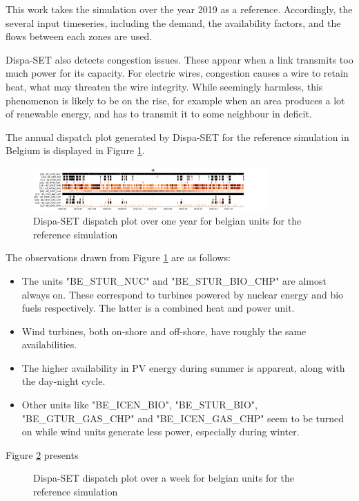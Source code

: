 This work takes the simulation over the year 2019 as a reference. Accordingly, the several input timeseries, including the demand, the availability factors, and the flows between each zones are used.

Dispa-SET also detects congestion issues. These appear when a link transmits too much power for its capacity. For electric wires, congestion causes a wire to retain heat, what may threaten the wire integrity. While seemingly harmless, this phenomenon is likely to be on the rise, for example when an area produces a lot of renewable energy, and has to transmit it to some neighbour in deficit.

The annual dispatch plot generated by Dispa-SET for the reference simulation in Belgium is displayed in Figure \ref{fig:dispatch-be}.

\begin{figure}[h]
    \centering
    \includegraphics[width=0.8\textwidth]{resources/images/dispatch-BE.png}
    \caption{Dispa-SET dispatch plot over one year for belgian units for the reference simulation}
    \label{fig:dispatch-be}
\end{figure}

The observations drawn from Figure \ref{fig:dispatch-be} are as follows:
\begin{itemize}
    \item The units "BE\_STUR\_NUC" and "BE\_STUR\_BIO\_CHP" are almost always on. These correspond to turbines powered by nuclear energy and bio fuels respectively. The latter is a combined heat and power unit.
    \item Wind turbines, both on-shore and off-shore, have roughly the same availabilities.
    \item The higher availability in PV energy during summer is apparent, along with the day-night cycle.
    \item Other units like "BE\_ICEN\_BIO", "BE\_STUR\_BIO", "BE\_GTUR\_GAS\_CHP" and "BE\_ICEN\_GAS\_CHP" seem to be turned on while wind units generate less power, especially during winter.
\end{itemize}

Figure \ref{fig:dispatch-be-week} presents

\begin{figure}[h]
    \centering
    \caption{Dispa-SET dispatch plot over a week for belgian units for the reference simulation}
    \label{fig:dispatch-be-week}
\end{figure}